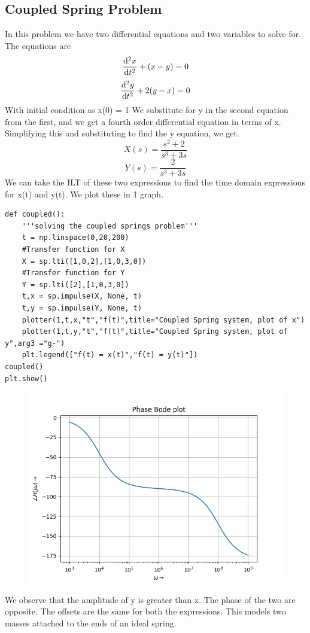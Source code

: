 \documentclass[11pt, a4paper]{article}
\begin{document}
\subsection{Coupled Spring Problem}
{
In this problem we have two differential equations and two variables to solve for.
The equations are
\[\dv[2]{x}{t} +(x-y) = 0 \]
\[\dv[2]{y}{t} +2(y-x) = 0 \]
With initial condition as x(0) = 1
We substitute for y in the second equation from the first, and we get a fourth order differential equation in terms of x.
Simplifying this and substituting to find the y equation, we get.
\[X(s) = \frac{s^2+2}{s^3+3s} \]
\[Y(s) =  \frac{2}{s^3+3s} \]
We can take the ILT of these two expressions to find the time domain expressions for x(t) and y(t).
We plot these in 1 graph.
}
\begin{verbatim}
def coupled():
    '''solving the coupled springs problem'''
    t = np.linspace(0,20,200)
    #Transfer function for X
    X = sp.lti([1,0,2],[1,0,3,0])
    #Transfer function for Y
    Y = sp.lti([2],[1,0,3,0])
    t,x = sp.impulse(X, None, t)
    t,y = sp.impulse(Y, None, t)
    plotter(1,t,x,"t","f(t)",title="Coupled Spring system, plot of x")
    plotter(1,t,y,"t","f(t)",title="Coupled Spring system, plot of y",arg3 ="g-")
    plt.legend(["f(t) = x(t)","f(t) = y(t)"])
coupled()
plt.show()

\end{verbatim}
\begin{figure}[!tbh]
   	\centering
   	\includegraphics[scale=0.5]{Figure_5.png}
   	\label{fig:32}
   \end{figure}
{ 
We observe that the amplitude of y is greater than x. 
The phase of the two are opposite.
The offsets are the same for both the expressions.
This models two masses attached to the ends of an ideal spring.
}
\end{document}
